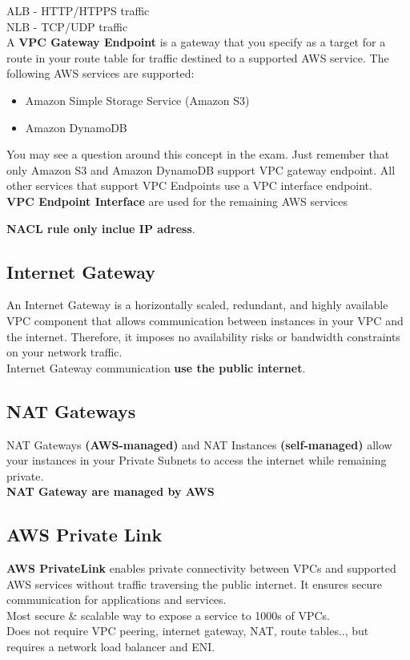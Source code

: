 \documentclass[12pt, letterpaper, twoside]{article}
\begin{document}
ALB - HTTP/HTPPS traffic\\
NLB - TCP/UDP traffic\\

A \textbf{VPC Gateway Endpoint} is a gateway that you specify as a target for a route in your route table for traffic 
destined to a supported AWS service. The following AWS services are supported:
\begin{itemize}
	\item Amazon Simple Storage Service (Amazon S3)
	\item Amazon DynamoDB
\end{itemize}
You may see a question around this concept in the exam. Just remember that only Amazon S3 and Amazon DynamoDB 
support VPC gateway endpoint. All other services that support VPC Endpoints use a VPC interface endpoint.\\
\textbf{VPC Endpoint Interface} are used for the remaining AWS services

\textbf{NACL rule only inclue IP adress}.\\

\subsection{Internet Gateway}
An Internet Gateway is a horizontally scaled, redundant, and highly available VPC component that allows communication between instances 
in your VPC and the internet. Therefore, it imposes no availability risks or bandwidth constraints on your network traffic.\\
Internet Gateway communication \textbf{use the public internet}.\\

\subsection{NAT Gateways}
NAT Gateways \textbf{(AWS-managed)} and NAT Instances \textbf{(self-managed)} allow your instances in your Private Subnets
to access the internet while remaining private.\\
\textbf{NAT Gateway are managed by AWS}

\subsection{AWS Private Link}
\textbf{AWS PrivateLink} enables private connectivity between VPCs and supported AWS services without traffic traversing the 
public internet. It ensures secure communication for applications and services.\\
Most secure \& scalable way to expose a service to 1000s of VPCs.\\
Does not require VPC peering, internet gateway, NAT, route tables.., but requires a network load balancer and ENI.\\
\end{document}
